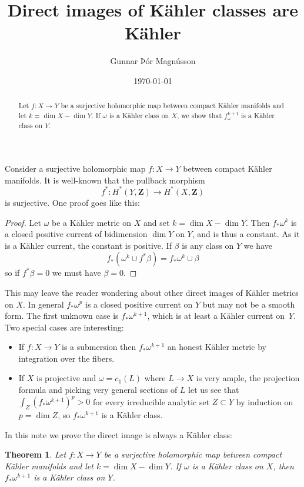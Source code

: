 \documentclass[11pt]{amsart}
\author{Gunnar Þór Magnússon}
\date{\today}
\title{Direct images of K\"ahler classes are K\"ahler}
\newtheorem{theo}{Theorem}
\theoremstyle{definition}
\def\ZZ{\mathbf{Z}}
\begin{document}
\begin{abstract}
Let $f : X \to Y$ be a surjective holomorphic map between compact K\"ahler manifolds and let $k = \dim X - \dim Y$.
If $\omega$ is a K\"ahler class on $X$, we show that $f_\omega^{k+1}$ is a K\"ahler class on $Y$.
\end{abstract}


\maketitle



Consider a surjective holomorphic map $f : X \to Y$ between compact K\"ahler manifolds.
It is well-known that the pullback morphism 
\[
f^* : H^*(Y,\ZZ) \to H^*(X,\ZZ)
\]
is surjective.
One proof goes like this:

\begin{proof}
Let $\omega$ be a K\"ahler metric on $X$ and set $k = \dim X - \dim Y$.
Then $f_*\omega^k$ is a closed positive current of bidimension $\dim Y$ on $Y$, and is thus a constant.
As it is a K\"ahler current, the constant is positive.
If $\beta$ is any class on $Y$ we have
\[
f_*(\omega^k \cup f^*\beta) = f_*\omega^k \cup \beta
\]
so if $f^*\beta = 0$ we must have $\beta = 0$.
\end{proof}


This may leave the reader wondering about other direct images of K\"ahler metrics on $X$.
In general $f_*\omega^p$ is a closed positive current on $Y$ but may not be a smooth form.
The first unknown case is $f_*\omega^{k+1}$, which is at least a K\"ahler current on~$Y$.
Two special cases are interesting:

\begin{itemize}
\item
If $f : X \to Y$ is a submersion then $f_*\omega^{k+1}$ an honest K\"ahler metric by integration over the fibers.

\item
If $X$ is projective and $\omega = c_1(L)$ where $L \to X$ is very ample, the projection formula and picking very general sections of $L$ let us see that $\int_Z (f_*\omega^{k+1})^p > 0$ for every irreducible analytic set $Z \subset Y$ by induction on $p = \dim Z$, so $f_*\omega^{k+1}$ is a K\"ahler class.
\end{itemize}


In this note we prove the direct image is always a K\"ahler class:

\begin{theo}
\label{theo:main}
Let $f : X \to Y$ be a surjective holomorphic map between compact K\"ahler manifolds and let $k = \dim X - \dim Y$.
If $\omega$ is a K\"ahler class on $X$, then $f_*\omega^{k+1}$ is a K\"ahler class on $Y$.
\end{theo}
\end{document}

